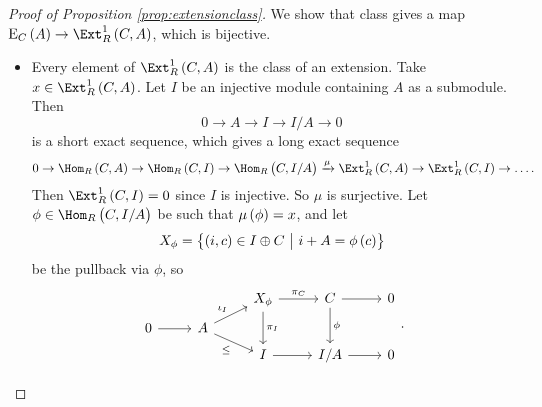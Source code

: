 \begin{proof}[Proof of Proposition \ref{prop:extensionclass}]
We show that class gives a map $ \E_C\br{A} \to \Ext_R^1\br{C, A} $, which is bijective.
\begin{itemize}
\item Every element of $ \Ext_R^1\br{C, A} $ is the class of an extension. Take $ x \in \Ext_R^1\br{C, A} $. Let $ I $ be an injective module containing $ A $ as a submodule. Then
$$ 0 \to A \to I \to I / A \to 0 $$
is a short exact sequence, which gives a long exact sequence
$$ 0 \to \Hom_R\br{C, A} \to \Hom_R\br{C, I} \to \Hom_R\br{C, I / A} \xrightarrow{\mu} \Ext_R^1\br{C, A} \to \Ext_R^1\br{C, I} \to \dots. $$
Then $ \Ext_R^1\br{C, I} = 0 $ since $ I $ is injective. So $ \mu $ is surjective. Let $ \phi \in \Hom_R\br{C, I / A} $ be such that $ \mu\br{\phi} = x $, and let
$$ X_\phi = \cbr{\br{i, c} \in I \oplus C \st i + A = \phi\br{c}} $$
be the pullback via $ \phi $, so
$$
\begin{tikzcd}[row sep=tiny]
& & X_\phi \arrow{r}{\pi_C} \arrow{dd}{\pi_I} & C \arrow{r} \arrow{dd}{\phi} & 0 \\
0 \arrow{r} & A \arrow{ur}{\iota_I} \arrow{dr}[swap]{\le} & & \\
& & I \arrow{r} & I / A \arrow{r} & 0
\end{tikzcd}.
$$

\pagebreak


\end{itemize}
\end{proof}
